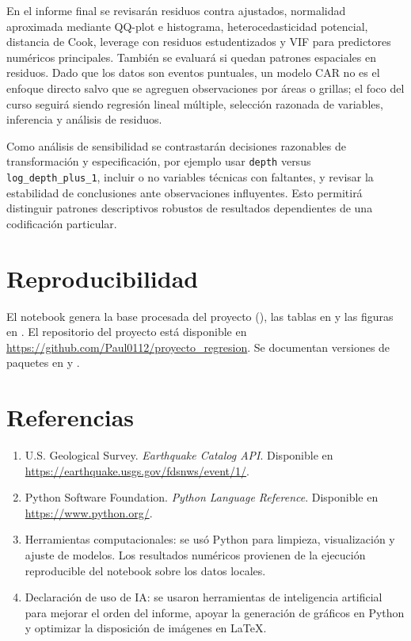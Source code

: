 \documentclass{style}
\newcommand{\var}[1]{\texttt{#1}}
\begin{document}
En el informe final se revisarán residuos contra ajustados, normalidad aproximada mediante QQ-plot e histograma, heterocedasticidad potencial, distancia de Cook, leverage con residuos estudentizados y VIF para predictores numéricos principales. También se evaluará si quedan patrones espaciales en residuos. Dado que los datos son eventos puntuales, un modelo CAR no es el enfoque directo salvo que se agreguen observaciones por áreas o grillas; el foco del curso seguirá siendo regresión lineal múltiple, selección razonada de variables, inferencia y análisis de residuos.

Como análisis de sensibilidad se contrastarán decisiones razonables de transformación y especificación, por ejemplo usar \var{depth} versus \var{log\_depth\_plus\_1}, incluir o no variables técnicas con faltantes, y revisar la estabilidad de conclusiones ante observaciones influyentes. Esto permitirá distinguir patrones descriptivos robustos de resultados dependientes de una codificación particular.

\section{Reproducibilidad}

El notebook  genera la base procesada del proyecto (), las tablas en  y las figuras en . El repositorio del proyecto está disponible en \url{https://github.com/Paul0112/proyecto_regresion}. Se documentan versiones de paquetes en  y .

\section*{Referencias}

\begin{enumerate}
    \item U.S. Geological Survey. \textit{Earthquake Catalog API}. Disponible en \url{https://earthquake.usgs.gov/fdsnws/event/1/}.
    \item Python Software Foundation. \textit{Python Language Reference}. Disponible en \url{https://www.python.org/}.
    \item Herramientas computacionales: se usó Python para limpieza, visualización y ajuste de modelos. Los resultados numéricos provienen de la ejecución reproducible del notebook sobre los datos locales.
    \item Declaración de uso de IA: se usaron herramientas de inteligencia artificial para mejorar el orden del informe, apoyar la generación de gráficos en Python y optimizar la disposición de imágenes en LaTeX.
\end{enumerate}
\end{document}
